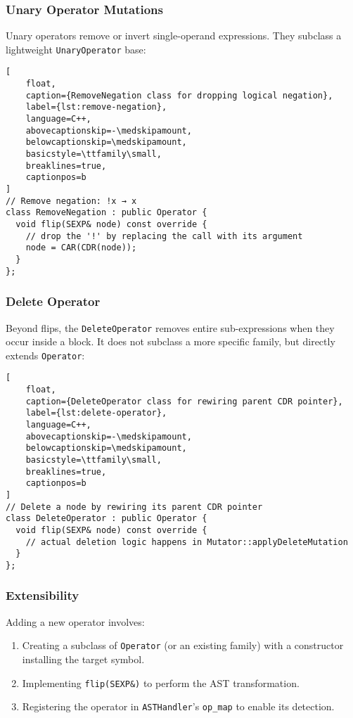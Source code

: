 \subsubsection{Unary Operator Mutations}

Unary operators remove or invert single-operand expressions. They subclass a lightweight \texttt{UnaryOperator} base:

\begin{lstlisting}[
    float,
    caption={RemoveNegation class for dropping logical negation},
    label={lst:remove-negation},
    language=C++,
    abovecaptionskip=-\medskipamount,
    belowcaptionskip=\medskipamount,
    basicstyle=\ttfamily\small,
    breaklines=true,
    captionpos=b
]
// Remove negation: !x → x
class RemoveNegation : public Operator {
  void flip(SEXP& node) const override {
    // drop the '!' by replacing the call with its argument
    node = CAR(CDR(node));
  }
};
\end{lstlisting}


\subsubsection{Delete Operator}

Beyond flips, the \texttt{DeleteOperator} removes entire sub-expressions when they occur inside a block. It does not subclass a more specific family, but directly extends \texttt{Operator}:

\begin{lstlisting}[
    float,
    caption={DeleteOperator class for rewiring parent CDR pointer},
    label={lst:delete-operator},
    language=C++,
    abovecaptionskip=-\medskipamount,
    belowcaptionskip=\medskipamount,
    basicstyle=\ttfamily\small,
    breaklines=true,
    captionpos=b
]
// Delete a node by rewiring its parent CDR pointer
class DeleteOperator : public Operator {
  void flip(SEXP& node) const override {
    // actual deletion logic happens in Mutator::applyDeleteMutation
  }
};
\end{lstlisting}


\subsubsection{Extensibility}

Adding a new operator involves:

\begin{enumerate}
  \item Creating a subclass of \texttt{Operator} (or an existing family) with a constructor installing the target symbol.
  \item Implementing \texttt{flip(SEXP\&)} to perform the AST transformation.
  \item Registering the operator in \texttt{ASTHandler}’s \texttt{op\_map} to enable its detection.
\end{enumerate}

